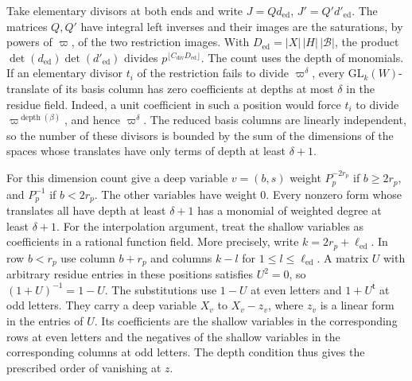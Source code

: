 Take elementary divisors at both ends and write
\(J=Qd_\mathrm{ed}\), \(J'=Q'd'_\mathrm{ed}\). The matrices \(Q,Q'\) have
integral left inverses and their images are the saturations,
by powers of \(\varpi\), of the two restriction images.
With \(D_\mathrm{ed}=|X|\,|H|\,|\mathcal B|\), the product
\(\det(d_\mathrm{ed})\det(d'_\mathrm{ed})\) divides
\(p^{\lfloor C_{\mathrm{div}}D_\mathrm{ed}\rfloor}\).
The count uses the depth of monomials. If an elementary divisor
\(t_i\) of the restriction fails to divide \(\varpi^\delta\),
every \(\mathrm{GL}_k(W)\)-translate of its basis column has zero
coefficients at depths at most \(\delta\) in the residue field.
Indeed, a unit coefficient in such a position would force \(t_i\)
to divide \(\varpi^{\operatorname{depth}(\beta)}\), and hence
\(\varpi^\delta\).
The reduced basis columns are linearly independent, so the number
of these divisors is bounded by the sum of the dimensions of the
spaces whose translates have only terms of depth at least
\(\delta+1\).

For this dimension count give a deep variable \(v=(b,s)\) weight
\(P_p^{-2r_p}\) if \(b\ge2r_p\), and \(P_p^{-1}\) if \(b<2r_p\).
The other variables have weight \(0\).
Every nonzero form whose translates all have depth at least
\(\delta+1\) has a monomial of weighted degree at least \(\delta+1\).
For the interpolation argument, treat the shallow variables as
coefficients in a rational function field.
More precisely, write \(k=2r_p+\ell_\mathrm{ed}\). In row \(b<r_p\)
use column \(b+r_p\) and columns \(k-l\) for \(1\le l\le\ell_\mathrm{ed}\).
A matrix \(U\) with arbitrary residue entries in these positions
satisfies \(U^2=0\), so \((1+U)^{-1}=1-U\).
The substitutions use \(1-U\) at even letters and \(1+U^{\mathsf t}\)
at odd letters. They carry a deep variable \(X_v\) to \(X_v-z_v\),
where \(z_v\) is a linear form in the entries of \(U\). Its
coefficients are the shallow variables in the corresponding rows
at even letters and the negatives of the shallow variables in the
corresponding columns at odd letters. The depth condition thus
gives the prescribed order of vanishing at \(z\).

